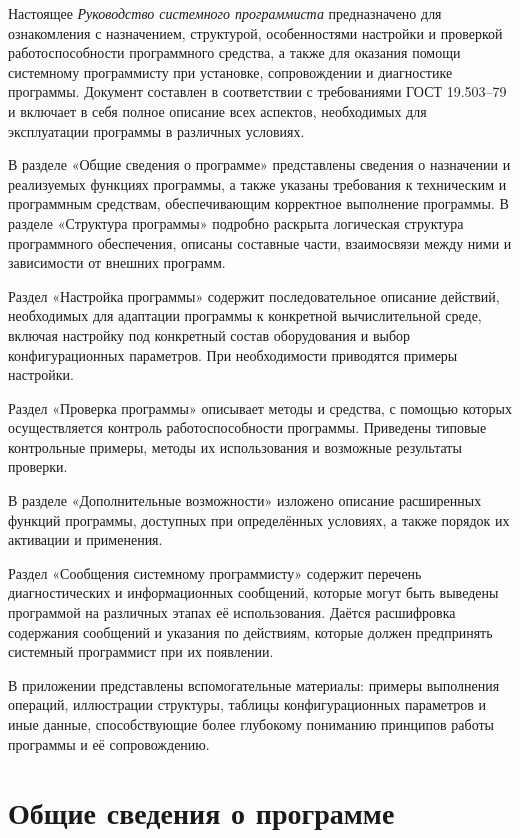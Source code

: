 \newpage\annotation

Настоящее \textit{Руководство системного программиста} предназначено для ознакомления с назначением, структурой, особенностями настройки и проверкой работоспособности программного средства, а также для оказания помощи системному программисту при установке, сопровождении и диагностике программы. Документ составлен в соответствии с требованиями ГОСТ 19.503–79 и включает в себя полное описание всех аспектов, необходимых для эксплуатации программы в различных условиях.

В разделе «Общие сведения о программе» представлены сведения о назначении и реализуемых функциях программы, а также указаны требования к техническим и программным средствам, обеспечивающим корректное выполнение программы. В разделе «Структура программы» подробно раскрыта логическая структура программного обеспечения, описаны составные части, взаимосвязи между ними и зависимости от внешних программ.

Раздел «Настройка программы» содержит последовательное описание действий, необходимых для адаптации программы к конкретной вычислительной среде, включая настройку под конкретный состав оборудования и выбор конфигурационных параметров. При необходимости приводятся примеры настройки.

Раздел «Проверка программы» описывает методы и средства, с помощью которых осуществляется контроль работоспособности программы. Приведены типовые контрольные примеры, методы их использования и возможные результаты проверки.

В разделе «Дополнительные возможности» изложено описание расширенных функций программы, доступных при определённых условиях, а также порядок их активации и применения.

Раздел «Сообщения системному программисту» содержит перечень диагностических и информационных сообщений, которые могут быть выведены программой на различных этапах её использования. Даётся расшифровка содержания сообщений и указания по действиям, которые должен предпринять системный программист при их появлении.

В приложении представлены вспомогательные материалы: примеры выполнения операций, иллюстрации структуры, таблицы конфигурационных параметров и иные данные, способствующие более глубокому пониманию принципов работы программы и её сопровождению.

\newpage
\section{Общие сведения о программе}

